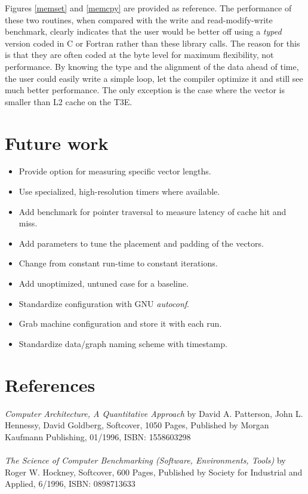 \documentclass [12pt]{article}
\begin{document}
Figures \ref{memset} and \ref{memcpy} are provided as reference. The
performance of these two routines, when compared with the write and read-modify-write benchmark, clearly indicates that the user
would be better off using a {\em typed} version coded in C or Fortran
rather than these library calls. The reason for this is that they are
often coded at the byte level for maximum flexibility, not
performance. By knowing the type and the alignment of the data ahead of
time, the user could easily write a simple loop, let the compiler
optimize it and still see much better performance. The only exception
is the case where the vector is smaller than L2 cache on the T3E.

\clearpage
\newpage

\section{Future work}

\begin{itemize}
\item Provide option for measuring specific vector lengths.
\item Use specialized, high-resolution timers where available.
\item Add benchmark for pointer traversal to measure latency of cache hit 
and miss.
\item Add parameters to tune the placement and padding of the vectors.
\item Change from constant run-time to constant iterations.
\item Add unoptimized, untuned case for a baseline.
\item Standardize configuration with GNU {\em autoconf}.
\item Grab machine configuration and store it with each run.
\item Standardize data/graph naming scheme with timestamp.
\end{itemize}

\section{References}

{\em Computer Architecture, A Quantitative Approach} by David A. Patterson, John L. Hennessy, David Goldberg,
Softcover, 1050 Pages, Published by Morgan Kaufmann Publishing, 01/1996, ISBN: 1558603298 \\ \ \\
{\em The Science of Computer Benchmarking (Software, Environments, Tools)} by Roger W. Hockney,
Softcover, 600 Pages, Published by Society for Industrial and Applied, 6/1996, ISBN: 0898713633
\end{document}

